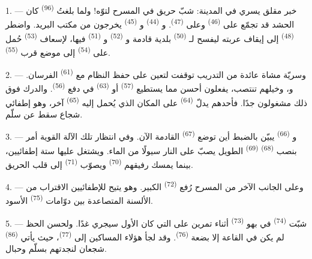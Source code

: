 \VUsaut{5.0mm}
\VUsaut{3.0mm}

\VUsaut{3.4mm}

1. --- خبر مقلق يسري في المدينة: شبّ حريق في المسرح لتوّه! ولما بلغتُ
 \textsuperscript{(96)} كان الحشد قد تجمّع على 
\textsuperscript{(46)} وعلى  \textsuperscript{(47)}. و \textsuperscript{(44)} و \textsuperscript{(45)} يخرجون من
مكتب البريد. واضطر  \textsuperscript{(48)} إلى إيقاف عربته
ليفسح لـ \textsuperscript{(50)} بلدية قادمة و
\textsuperscript{(52)} و \textsuperscript{(51)} فيها، لإسعاف
 \textsuperscript{(53)} حُمل على  \textsuperscript{(54)} إلى
موضع قرب  \textsuperscript{(55)}.

2. --- وسريّة مشاة عائدة من التدريب توقفت لتعين على حفظ النظام مع
 \textsuperscript{(61)} الفرسان. و، وخيلهم
تنتصب، يفعلون أحسن مما يستطيع 
\textsuperscript{(57)} أو  \textsuperscript{(63)} في دفع
 \textsuperscript{(56)}. والدرك
فوق ذلك مشغولون جدًا. فأحدهم يدلّ  \textsuperscript{(64)} على
المكان الذي يُحمل إليه  \textsuperscript{(65)} آخر، وهو إطفائي شجاع
سقط عن سلّم.

3. --- و \textsuperscript{(66)} يبيّن بالضبط أين توضع
 \textsuperscript{(67)} القادمة الآن. وفي انتظار تلك
الآلة القوية أمر بنصب  \textsuperscript{(68)}
 \textsuperscript{(69)} الطويل يصبّ على النار سيولًا من الماء.
ويشتغل عليها ستة إطفائيين، بينما يمسك رفيقهم 
\textsuperscript{(70)} ويصوّب  \textsuperscript{(71)} إلى قلب الحريق.

4. --- وعلى الجانب الآخر من المسرح رُفع  \textsuperscript{(72)}
الكبير. وهو يتيح للإطفائيين الاقتراب من الألسنة المتصاعدة بين دوّامات
 \textsuperscript{(75)} الأسود.

\VUsaut{5.0mm}
\VUsaut{3.4mm}

5. --- شبّت  \textsuperscript{(74)} في بهو 
\textsuperscript{(73)} أثناء تمرين على  التي كان 
الأول سيجري غدًا. ولحسن الحظ لم يكن في القاعة إلا بضعة 
\textsuperscript{(76)}. وقد لجأ هؤلاء المساكين إلى  \textsuperscript{(77)}،
حيث يأتي  \textsuperscript{(86)} شجعان لنجدتهم بسلّم وحبال.

